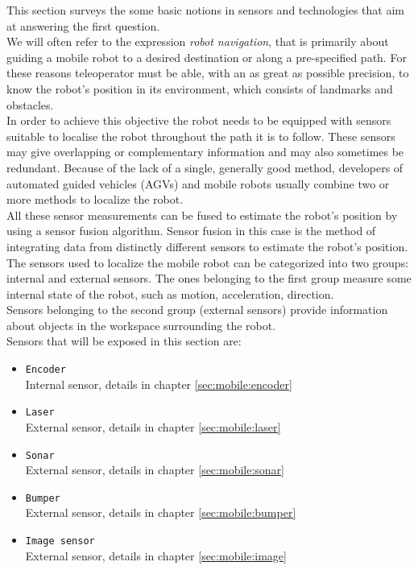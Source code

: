 This section surveys the some basic notions in sensors 
and technologies that aim at answering the
first question.
\\
We will often refer to the expression \textit{robot navigation},
that is primarily about guiding a mobile robot to a desired destination
or along a pre-specified path. For these reasons teleoperator must
be able, with an as great as possible precision, to know the robot's
position in its environment, which consists of landmarks and obstacles.
\\
In order to achieve this objective the robot needs to be equipped with
sensors suitable to localise the robot throughout the path it is to follow.
These sensors may give overlapping or complementary information and may
also sometimes be redundant. Because of the lack of a single, generally
good method, developers of  automated guided vehicles (AGVs) and mobile
robots usually combine two or more methods to localize the robot.
\\
All these sensor measurements can be fused to estimate the robot's
position by using a sensor fusion algorithm. Sensor fusion
in this case is the method of integrating data from distinctly
different sensors to estimate the robot's position.
\\
The sensors used to localize the mobile robot can be categorized into
two groups: internal and external sensors. The ones belonging to the first
group measure some internal state of the robot, such as motion, acceleration,
direction.
\\
Sensors belonging to the second group (external sensors) provide information
about objects in the workspace surrounding the robot.
\\
Sensors that will be exposed in this section are:
\begin{itemize}
\item \texttt{Encoder} \\
  Internal sensor, details in chapter \ref{sec:mobile:encoder}
\item \texttt{Laser} \\
  External sensor, details in chapter \ref{sec:mobile:laser}
\item \texttt{Sonar} \\
  External sensor, details in chapter \ref{sec:mobile:sonar}
\item \texttt{Bumper} \\
  External sensor, details in chapter \ref{sec:mobile:bumper}
\item \texttt{Image sensor} \\
  External sensor, details in chapter \ref{sec:mobile:image}
\end{itemize}

